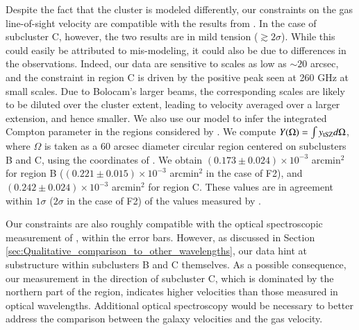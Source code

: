 \documentclass[twocolumn,traditabstract]{aa}
\begin{document}
Despite the fact that the cluster is modeled differently, our constraints on the gas line-of-sight velocity are compatible with the results from \cite{Sayers2013}. In the case of subcluster C, however, the two results are in mild tension ($\gtrsim 2 \sigma$). While this could easily be attributed to mis-modeling, it could also be due to differences in the observations. Indeed, our data are sensitive to scales as low as $\sim 20$ arcsec, and the constraint in region C is driven by the positive peak seen at 260 GHz at small scales. Due to Bolocam's larger beams, the corresponding scales are likely to be diluted over the cluster extent, leading to velocity averaged over a larger extension, and hence smaller. We also use our model to infer the integrated Compton parameter in the regions considered by \cite{Sayers2013}. We compute $Y(\Omega) = \int y_{\rm tSZ} d\Omega$, where $\Omega$ is taken as a 60 arcsec diameter circular region centered on subclusters B and C, using the coordinates of \cite{Sayers2013}. We obtain $\left(0.173 \pm 0.024\right) \times 10^{-3}$ arcmin$^2$ for region B ($\left(0.221 \pm 0.015\right) \times 10^{-3}$ arcmin$^2$ in the case of F2), and $\left(0.242 \pm 0.024\right) \times 10^{-3}$ arcmin$^2$ for region C. These values are in agreement within $1 \sigma$ ($2 \sigma$ in the case of F2) of the values measured by \cite{Sayers2013}.

Our constraints are also roughly compatible with the optical spectroscopic measurement of \cite{Ma2009}, within the error bars. However, as discussed in Section \ref{sec:Qualitative_comparison_to_other_wavelengths}, our data hint at substructure within subclusters B and C themselves. As a possible consequence, our measurement in the direction of subcluster C, which is dominated by the northern part of the region, indicates higher velocities than those measured in optical wavelengths. Additional optical spectroscopy would be necessary to better address the comparison between the galaxy velocities and the gas velocity.
\end{document}
